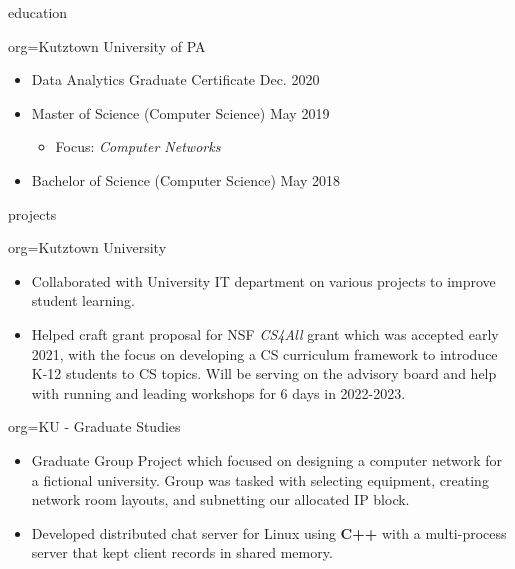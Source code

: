 \documentclass{resume}
\begin{document}
\begin{ResumeSection}{education}
    \begin{ResumeSubsection}{org={Kutztown University of PA}}
        \begin{itemize}
            \item Data Analytics Graduate Certificate \hfill Dec. 2020
            \item Master of Science (Computer Science) \hfill May 2019
            \begin{itemize}
                \item Focus: \emph{Computer Networks}
            \end{itemize}
            \item Bachelor of Science (Computer Science) \hfill May 2018
        \end{itemize}
    \end{ResumeSubsection}
\end{ResumeSection}

\begin{ResumeSection}{projects}
    \begin{ResumeSubsection}{org={Kutztown University}}
        \begin{itemize}
            \item Collaborated with University IT department on various projects to improve student learning. 
            \item Helped craft grant proposal for NSF \emph{CS4All} grant which was accepted early 2021,
            with the focus on developing a CS curriculum framework to introduce K-12 students to CS topics.  
            Will be serving on the advisory board and help with running and leading workshops for 6 days 
            in 2022-2023. 
        \end{itemize}
    \end{ResumeSubsection}
    \begin{ResumeSubsection}{org={KU - Graduate Studies}}
        \begin{itemize}
            \item Graduate Group Project which focused on designing a computer network for a fictional university. Group was tasked with 
            selecting equipment, creating network room layouts, and subnetting our allocated IP block. 
            \item Developed distributed chat server for Linux using \textbf{C++} with a multi-process server that kept client records in shared memory.
        \end{itemize}
    \end{ResumeSubsection}
\end{ResumeSection}
\end{document}
